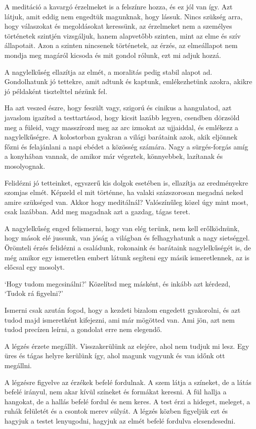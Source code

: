 A meditáció a kavargó érzelmeket is a felszínre hozza, és ez jól van
így. Azt látjuk, amit eddig nem engedtük magunknak, hogy lássuk. Nincs
szükség arra, hogy válaszokat és megoldásokat keressünk, az érzelmeket
nem a személyes történetek szintjén vizsgáljuk, hanem alapvetőbb
szinten, mint az elme és szív állapotait. Azon a szinten nincsenek
történetek, az érzés, az elmeállapot nem mondja meg magáról kicsoda és
mit gondol rólunk, ezt mi adjuk hozzá.

A nagylelkűség ellazítja az elmét, a moralitás pedig stabil alapot ad.
Gondolhatunk jó tettekre, amit adtunk és kaptunk, emlékezhetünk azokra,
akikre jó példaként tisztelttel nézünk fel.

Ha azt veszed észre, hogy feszült vagy, szigorú és cinikus a hangulatod,
azt javaslom igazítsd a testtartásod, hogy kicsit lazább legyen,
csendben dörzsöld meg a füleid, vagy masszírozd meg az arc izmokat az
ujjaiddal, és emlékezz a nagylelkűségre. A kolostorban gyakran a világi
barátaink azok, akik eljönnek főzni és felajánlani a napi ebédet a
közösség számára. Nagy a sürgés-forgás amíg a konyhában vannak, de
amikor már végeztek, könnyebbek, lazítanak és mosolyognak.

Felidézni jó tetteinket, egyszerű kis dolgok esetében is, ellazítja az
eredményekre szomjas elmét. Képzeld el mit történne, ha valaki
százszorosan megadná neked amire szükséged van. Akkor hogy meditálnál?
Valószínűleg közel úgy mint most, csak lazábban. Add meg magadnak azt a
gazdag, tágas teret.

A nagylelkűség enged felismerni, hogy van elég terünk, nem kell
erőlködnünk, hogy mások elé jussunk, van jóság a világban és
felhagyhatunk a nagy sietséggel. Örömteli érzés felidézni a családunk,
rokonaink és barátaink nagylelkűségét is, de még amikor egy ismeretlen
embert látunk segíteni egy másik ismeretlennek, az is előcsal egy
mosolyt.

`Hogy tudom megcsinálni?' Közelítsd meg másként, és inkább azt kérdezd,
`Tudok rá figyelni?'

Ismerni csak azután fogod, hogy a kezdeti bizalom engedett gyakorolni,
és azt tudod majd ismeretként kifejezni, ami már mögötted van. Ami jön,
azt nem tudod precízen leírni, a gondolat erre nem elegendő.

A légzés érzete megállít. Visszakerülünk az elejére, ahol nem tudjuk mi
lesz. Egy üres és tágas helyre kerülünk így, ahol magunk vagyunk és van
időnk ott megállni.

A légzésre figyelve az érzékek befelé fordulnak. A szem látja a
színeket, de a látás befelé irányul, nem akar kívül színeket és formákat
keresni. A fül hallja a hangokat, de a hallás befelé fordul és nem
keres. A test érzi a hideget, meleget, a ruhák felületét és a csontok
merev súlyát. A légzés közben figyeljük ezt és hagyjuk a testet
lenyugodni, hagyjuk az elmét befelé fordulva elcsendesedni.

